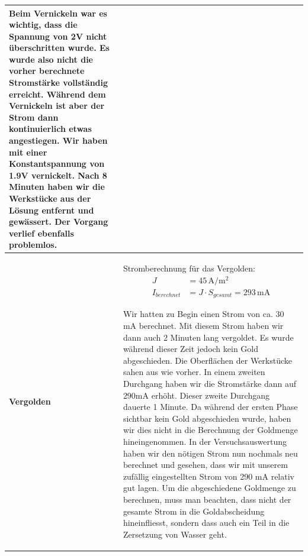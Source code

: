 \begin{longtable}{p{3cm}p{14cm}}
    Beim Vernickeln war es wichtig, dass die Spannung von 2V nicht überschritten wurde. Es wurde also nicht die vorher berechnete Stromstärke vollständig erreicht. Während dem Vernickeln ist aber der Strom dann kontinuierlich etwas angestiegen. Wir haben mit einer Konstantspannung von 1.9V vernickelt. Nach 8 Minuten haben wir die Werkstücke aus der Lösung entfernt und gewässert. Der Vorgang verlief ebenfalls problemlos.\\
    \hline
    
    \textbf{Vergolden}
    & Stromberechnung für das Vergolden:
    $$\begin{aligned}
        J &= 45 \, \mathrm{A/m^2}\\
        I_{berechnet} &= J \cdot S_{gesamt} = 293 \, \mathrm{mA}
    \end{aligned}$$
    
    Wir hatten zu Begin einen Strom von ca. 30 mA berechnet. Mit diesem Strom haben wir dann auch 2 Minuten lang vergoldet. Es wurde während dieser Zeit jedoch kein Gold abgeschieden. Die Oberflächen der Werkstücke sahen aus wie vorher.\newline
    In einem zweiten Durchgang haben wir die Stromstärke dann auf 290mA erhöht. Dieser zweite Durchgang dauerte 1 Minute. Da während der ersten Phase sichtbar kein Gold abgeschieden wurde, haben wir dies nicht in die Berechnung der Goldmenge hineingenommen.\newline
    In der Versuchsauswertung haben wir den nötigen Strom nun nochmals neu berechnet und gesehen, dass wir mit unserem zufällig eingestellten Strom von 290 mA relativ gut lagen.\newline
    Um die abgeschiedene Goldmenge zu berechnen, muss man beachten, dass nicht der gesamte Strom in die Goldabscheidung hineinfliesst, sondern dass auch ein Teil in die Zersetzung von Wasser geht.
\end{longtable}
\newpage

